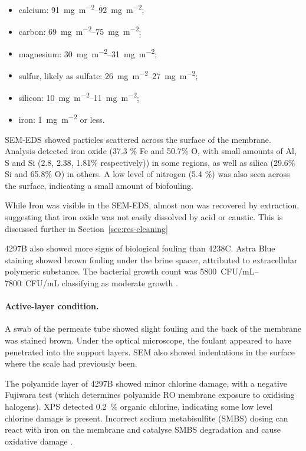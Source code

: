 \begin{itemize}
  \item calcium: \qtyrange{91}{92}{mg.m^{-2}};
  \item carbon: \qtyrange{69}{75}{mg.m^{-2}};
  \item magnesium: \qtyrange{30}{31}{mg.m^{-2}};
  \item sulfur, likely as sulfate: \qtyrange{26}{27}{mg.m^{-2}};
  \item silicon: \qtyrange{10}{11}{mg.m^{-2}};
  \item iron: \qty{1}{mg.m^{-2}} or less.
\end{itemize}

SEM-EDS showed particles scattered across the surface of the membrane. Analysis detected iron oxide (37.3 \% Fe and 50.7\% O, with small amounts of Al, S and Si (2.8, 2.38, 1.81\% respectively)) in some regions, as well as silica (29.6\% Si and 65.8\% O) in others. A low level of nitrogen (5.4 \%) was also seen across the surface, indicating a small amount of biofouling. 

While Iron was visible in the SEM-EDS, almost non was recovered by extraction, suggesting that iron oxide was not easily dissolved by acid or caustic. This is discussed further in Section~\ref{sec:res-cleaning}

4297B also showed more signs of biological fouling than 4238C. Astra Blue staining showed brown fouling under the brine spacer, attributed to extracellular polymeric substance. The bacterial growth count was \qtyrange{5800}{7800}{CFU/mL} classifying as moderate growth \citep{MembraneWorks2026Mine}.

\paragraph{Active-layer condition.}
A swab of the permeate tube showed slight fouling and the back of the membrane was stained brown. Under the optical microscope, the foulant appeared to have penetrated into the support layers. SEM also showed indentations in the surface where the scale had previously been. 

The polyamide layer of 4297B showed minor chlorine damage, with a negative Fujiwara test (which determines polyamide RO membrane exposure to oxidising halogens). XPS detected \qty{0.2}{\percent} organic chlorine, indicating some low level chlorine damage is present. Incorrect sodium metabisulfite (SMBS) dosing can react with iron on the membrane and catalyse SMBS degradation and cause oxidative damage \citep{MembraneWorks2025Desal}.


